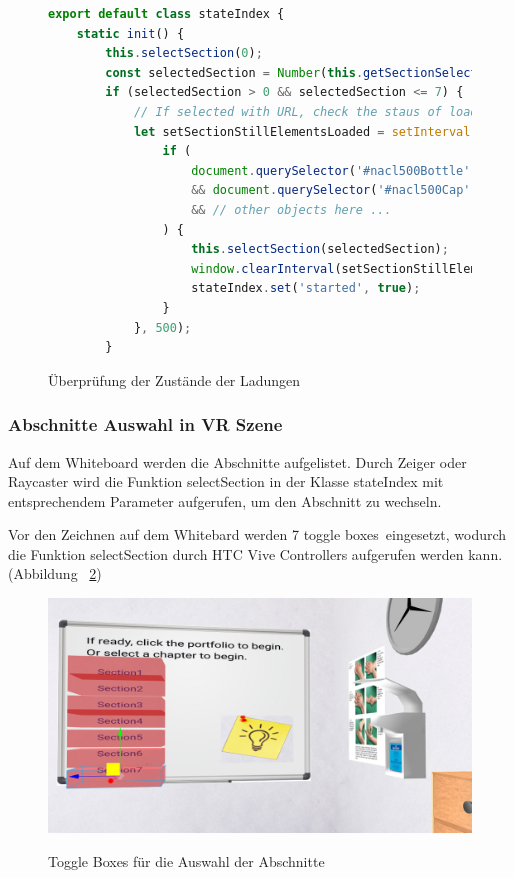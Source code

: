 \begin{figure}[ht]
\vspace*{1.2em}
\centering
\caption[Überprüfung der Zustände der Ladungen]{Überprüfung der Zustände der Ladungen}
\begin{lstlisting}[language=JavaScript, style=htmlcssjs]
export default class stateIndex {
    static init() {
        this.selectSection(0);
        const selectedSection = Number(this.getSectionSelectionFromURL());
        if (selectedSection > 0 && selectedSection <= 7) {
            // If selected with URL, check the staus of loading every 0.5 sec
            let setSectionStillElementsLoaded = setInterval(()=>{
                if (
                    document.querySelector('#nacl500Bottle')
                    && document.querySelector('#nacl500Cap')
                    && // other objects here ...
                ) {
                    this.selectSection(selectedSection);
                    window.clearInterval(setSectionStillElementsLoaded);
                    stateIndex.set('started', true);
                }
            }, 500);
        }
\end{lstlisting}

\label{fig:checkLadung} 
\end{figure}
  
  \subsubsection{Abschnitte Auswahl in VR Szene}
  Auf dem Whiteboard werden die Abschnitte aufgelistet. Durch Zeiger oder Raycaster wird die Funktion {\selectfont selectSection} in der Klasse {\selectfont stateIndex} mit entsprechendem Parameter aufgerufen, um den Abschnitt zu wechseln.
  
  Vor den Zeichnen auf dem Whitebard werden 7 \glqq toggle boxes\grqq\ eingesetzt, wodurch die Funktion {\selectfont selectSection} durch HTC Vive Controllers aufgerufen werden kann. (Abbildung ~\ref{fig:toggleBoxAbschnitte})
  
\begin{figure}[ht]
\vspace*{1em}
\centering
\caption[Toggle Boxes]{Toggle Boxes für die Auswahl der Abschnitte}
\includegraphics[width=\textwidth]{images/toggleBoxAbschnitte.png}
\label{fig:toggleBoxAbschnitte} 
\end{figure}
  
